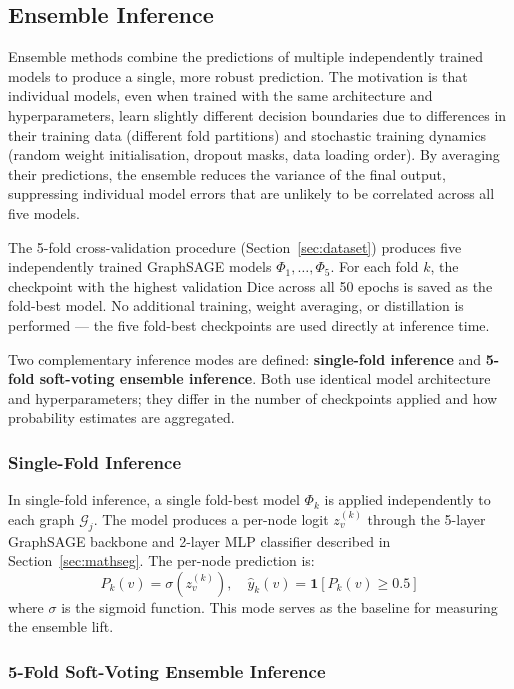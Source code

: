 \documentclass{article}
\begin{document}
\subsection{Ensemble Inference}
\label{sec:ensemble}

Ensemble methods combine the predictions of multiple independently trained models
to produce a single, more robust prediction. The motivation is that individual
models, even when trained with the same architecture and hyperparameters, learn
slightly different decision boundaries due to differences in their training data
(different fold partitions) and stochastic training dynamics (random weight
initialisation, dropout masks, data loading order). By averaging their predictions,
the ensemble reduces the variance of the final output, suppressing individual
model errors that are unlikely to be correlated across all five models.

The 5-fold cross-validation procedure (Section~\ref{sec:dataset}) produces five
independently trained GraphSAGE models $\Phi_1, \dots, \Phi_5$. For each fold $k$,
the checkpoint with the highest validation Dice across all 50 epochs is saved as
the fold-best model. No additional training, weight averaging, or distillation is
performed --- the five fold-best checkpoints are used directly at inference time.

Two complementary inference modes are defined: \textbf{single-fold inference} and
\textbf{5-fold soft-voting ensemble inference}. Both use identical model
architecture and hyperparameters; they differ in the number of checkpoints applied
and how probability estimates are aggregated.

\subsubsection{Single-Fold Inference}

In single-fold inference, a single fold-best model $\Phi_k$ is applied
independently to each graph $\mathcal{G}_j$. The model produces a per-node logit
$z_v^{(k)}$ through the 5-layer GraphSAGE backbone and 2-layer MLP classifier
described in Section~\ref{sec:mathseg}. The per-node prediction is:
\[
    P_k(v) = \sigma(z_v^{(k)}),
    \quad
    \hat{y}_k(v) = \mathbf{1}\!\left[P_k(v) \geq 0.5\right]
\]
where $\sigma$ is the sigmoid function. This mode serves as the baseline for
measuring the ensemble lift.

\subsubsection{5-Fold Soft-Voting Ensemble Inference}
\end{document}
